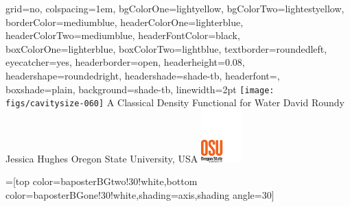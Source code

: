 \documentclass[landscape,a0paper,final,showframe]{baposter}
\begin{document}
\begin{poster}{
  grid=no,
  colspacing=1em,
  bgColorOne=lightyellow,
  bgColorTwo=lightestyellow,
  borderColor=mediumblue,
  headerColorOne=lighterblue,
  headerColorTwo=mediumblue,
  headerFontColor=black,
  boxColorOne=lighterblue,
  boxColorTwo=lightblue,
  textborder=roundedleft,
  eyecatcher=yes,
  headerborder=open,
  headerheight=0.08\textheight,
  headershape=roundedright,
  headershade=shade-tb,
  headerfont=\Large\textsf, %
  boxshade=plain,
  background=shade-tb,
  linewidth=2pt
  }
  { %
    \texttt{[image: figs/cavitysize-060]}
  }
  {\sf %
  A Classical Density Functional for Water}
  {\sf %
  David Roundy\hspace{3em}
  Jessica Hughes\hspace{3em}
  Oregon State University, USA
  }
  {
    \includegraphics[height=5.5em]{figs/osu-logo}
  }

  =[top color=baposterBGtwo!30!white,bottom color=baposterBGone!30!white,shading=axis,shading angle=30]

     \newlength{\leftimgwidth}
     \setlength{\leftimgwidth}{0.78em+8.0em}

    \newcommand{\colouredcircle}[1]{%
      \tikz{\useasboundingbox (-0.2em,-0.32em) rectangle(0.2em,0.32em); \draw[draw=black,fill=baposterBGone!80!black!#1!white,line width=0.03em] (0,0) circle(0.18em);}}


\end{poster}
\end{document}
